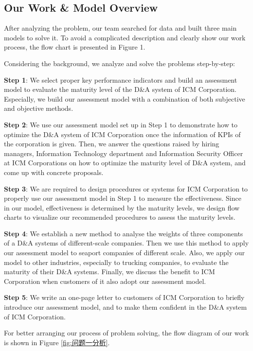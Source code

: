 \documentclass{mcmthesis}  %
\begin{document}
	\subsection{Our Work \& Model Overview}
	\indent After analyzing the problem, our team searched for data and built three main models to solve it. To avoid a complicated description and clearly show our work process, the flow chart is presented in Figure 1.
	
	Considering the background, we analyze and solve the problems step-by-step:
	
	\textbf{Step 1}: We select proper key performance indicators and build an assessment model to evaluate the maturity level of the D\&A system of ICM Corporation. Especially, we build our assessment model with a combination of both subjective and objective methods.
	
	\textbf{Step 2}: We use our assessment model set up in Step 1 to demonstrate how to optimize the D\&A system of ICM Corporation once the information of KPIs of the corporation is given. Then, we answer the questions raised by hiring managers, Information Technology department and Information Security Officer at ICM Corporations on how to optimize the maturity level of D\&A system, and come up with concrete proposals.
	
	\textbf{Step 3}: We are required to design procedures or systems for ICM Corporation to properly use our assessment model in Step 1 to measure the effectiveness. Since in our model, effectiveness is determined by the maturity levels, we design flow charts to visualize our recommended procedures to assess the maturity levels.
	
	\textbf{Step 4}: We establish a new method to analyse the weights of three components of a D\&A systems of different-scale companies. Then we use this method to apply our assessment model to seaport companies of different scale. Also, we apply our model to other industries, especially to trucking companies, to evaluate the maturity of their D\&A systems. Finally, we discuss the benefit to ICM Corporation when customers of it also adopt our assessment model.
	
	\textbf{Step 5}: We write an one-page letter to customers of ICM Corporation to briefly introduce our assessment model, and to make them confident in the D\&A system of ICM Corporation.
	
	For better arranging our process of problem solving, the flow diagram of our work is shown in Figure \ref{fig:问题一分析}.
	
\end{document}
